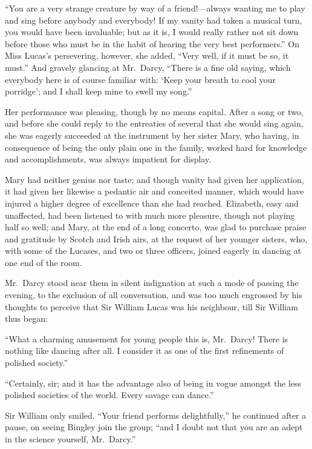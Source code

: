 \documentclass[12pt,english,oneside]{book}
\begin{document}
{}``You are a very strange creature by way of a friend!\mbox{---}always
wanting me to play and sing before anybody and everybody! If my vanity
had taken a musical turn, you would have been invaluable; but as it
is, I would really rather not sit down before those who must be in
the habit of hearing the very best performers.'' On Miss Lucas's
persevering, however, she added, {}``Very well, if it must be so,
it must.'' And gravely glancing at Mr.\ Darcy, {}``There is a fine
old saying, which everybody here is of course familiar with: `Keep
your breath to cool your porridge'; and I shall keep mine to swell
my song.''

Her performance was pleasing, though by no means capital. After a
song or two, and before she could reply to the entreaties of several
that she would sing again, she was eagerly succeeded at the instrument
by her sister Mary, who having, in consequence of being the only plain
one in the family, worked hard for knowledge and accomplishments,
was always impatient for display.

Mary had neither genius nor taste; and though vanity had given her
application, it had given her likewise a pedantic air and conceited
manner, which would have injured a higher degree of excellence than
she had reached. Elizabeth, easy and unaffected, had been listened
to with much more pleasure, though not playing half so well; and Mary,
at the end of a long concerto, was glad to purchase praise and gratitude
by Scotch and Irish airs, at the request of her younger sisters, who,
with some of the Lucases, and two or three officers, joined eagerly
in dancing at one end of the room.

Mr.\ Darcy stood near them in silent indignation at such a mode of
passing the evening, to the exclusion of all conversation, and was
too much engrossed by his thoughts to perceive that Sir William Lucas
was his neighbour, till Sir William thus began:

{}``What a charming amusement for young people this is, Mr.\ Darcy!
There is nothing like dancing after all. I consider it as one of the
first refinements of polished society.''

{}``Certainly, sir; and it has the advantage also of being in vogue
amongst the less polished societies of the world. Every savage can
dance.''

Sir William only smiled. {}``Your friend performs delightfully,''
he continued after a pause, on seeing Bingley join the group; {}``and
I doubt not that you are an adept in the science yourself, Mr.\ Darcy.''
\end{document}
